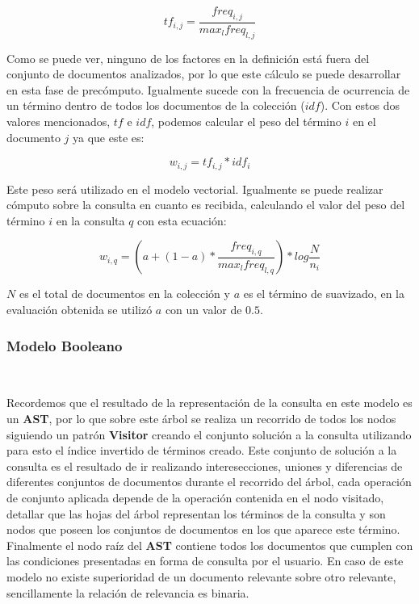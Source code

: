 \documentclass{llncs}
\begin{document}
\begin{equation}
    tf_{i, j} = \frac{freq_{i, j}}{max_l freq_{l, j}}
\end{equation}

Como se puede ver, ninguno de los factores en la definición está fuera del conjunto de documentos analizados, por lo que este cálculo se puede desarrollar en esta fase de precómputo. Igualmente sucede con la frecuencia de ocurrencia de un término dentro de todos los documentos de la colección ({\bfseries $idf$}). Con estos dos valores mencionados, $tf$ e $idf$, podemos calcular el peso del término $i$ en el documento $j$ ya que este es:

\begin{equation}
    w_{i, j} = tf_{i, j} * idf_{i}
\end{equation}

Este peso será utilizado en el modelo vectorial. Igualmente se puede realizar cómputo sobre la consulta en cuanto es recibida, calculando el valor del peso del término $i$ en la consulta $q$ con esta ecuación:

\begin{equation}
    w_{i, q} = (a + (1 - a) * \frac{freq_{i, q}}{max_l freq_{l, q}}) * log \frac{N}{n_i}
\end{equation}

$N$ es el total de documentos en la colección y $a$ es el término de suavizado, en la evaluación obtenida se utilizó $a$ con un valor de $0.5$.

\subsubsection{Modelo Booleano}\

Recordemos que el resultado de la representación de la consulta en este modelo es un {\bfseries AST}, por lo que sobre este árbol se realiza un recorrido de todos los nodos siguiendo un patrón {\bfseries Visitor} creando el conjunto solución a la consulta utilizando para esto el índice invertido de términos creado. Este conjunto de solución a la consulta es el resultado de ir realizando interesecciones, uniones y diferencias de diferentes conjuntos de documentos durante el recorrido del árbol, cada operación de conjunto aplicada depende de la operación contenida en el nodo visitado, detallar que las hojas del árbol representan los términos de la consulta y son nodos que poseen los conjuntos de documentos en los que aparece este término. Finalmente el nodo raíz del {\bfseries AST} contiene todos los documentos que cumplen con las condiciones presentadas en forma de consulta por el usuario. En caso de este modelo no existe superioridad de un documento relevante sobre otro relevante, sencillamente la relación de relevancia es binaria.
\end{document}
